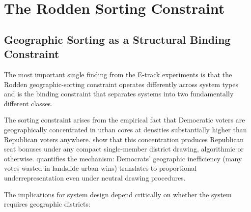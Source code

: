 \section{The Rodden Sorting Constraint}
\label{sec:constraints}

\subsection{Geographic Sorting as a Structural Binding Constraint}

The most important single finding from the E-track experiments is that the
Rodden geographic-sorting constraint \citep{rodden2019why} operates differently
across system types and is the binding constraint that separates systems into
two fundamentally different classes.

The sorting constraint arises from the empirical fact that Democratic voters are
geographically concentrated in urban cores at densities substantially higher than
Republican voters anywhere.  \citet{chen2013unintentional} show that this
concentration produces Republican seat bonuses under any compact single-member
district drawing, algorithmic or otherwise.  \citet{rodden2019why} quantifies
the mechanism: Democrats' geographic inefficiency (many votes wasted in
landslide urban wins) translates to proportional underrepresentation even
under neutral drawing procedures.

The implications for system design depend critically on whether the system
requires geographic districts:

